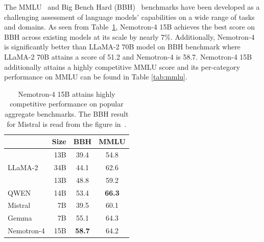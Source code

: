 \documentclass[11pt]{article}
\newcommand{\shrimai}[1]{{\color{red}{\textbf{Shrimai}: #1}}}
\newcommand{\ours}{Nemotron-4}
\begin{document}
The MMLU~\citep{hendrycks2020measuring} and Big Bench Hard (BBH)~\citep{suzgun2022challenging} benchmarks have been developed as a challenging assessment of language models' capabilities on a wide range of tasks and domains. As seen from  Table~\ref{tab:bbh_mmlu}, \ours{} 15B achieves the best score on BBH across existing models at its scale by nearly 7\%. 
Additionally, \ours{} is significantly better than LLaMA-2 70B model on BBH benchmark where LLaMA-2 70B attains a score of 51.2 and \ours{} is 58.7.
\ours{} 15B additionally attains a highly competitive MMLU score and its per-category performance on MMLU can be found in Table \ref{tab:mmlu}.




\begin{table}[h]
\centering
\begin{tabular}{lrcc} 
\toprule
    & Size & BBH & MMLU     \\ 
\midrule
\multirow{3}{*}{LLaMA-2} & 13B  & 39.4 & 54.8 \\
& 34B & 44.1 & 62.6 \\
\midrule
\multirow{1}{*}{Baichuan-2} & 13B  & 48.8 & 59.2 \\
\midrule
QWEN & 14B & 53.4 & \textbf{66.3} \\
\midrule
Mistral & 7B & 39.5 & 60.1 \\
\midrule
Gemma & 7B & 55.1 & 64.3 \\
\midrule
\ours{} & 15B & \textbf{58.7} & 64.2 \\ 
\bottomrule
\end{tabular}
\caption{\label{tab:bbh_mmlu} \ours{} 15B attains highly competitive performance on popular aggregate benchmarks. The BBH result for Mistral is read from the figure in~\citep{jiang2023mistral}.}
\end{table}
\end{document}
